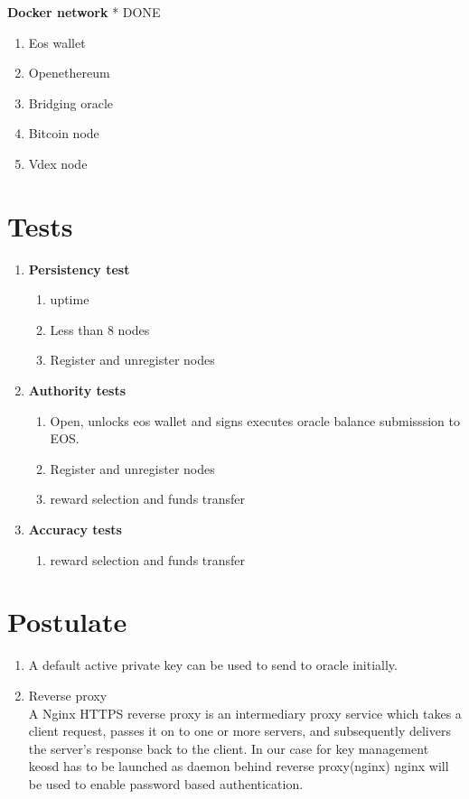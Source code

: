 \documentclass[]{article}
\begin{document}
   \textbf{Docker network}  * {\color{green} DONE}
  \begin{enumerate}
  	\item Eos wallet
  	\item Openethereum
  	\item Bridging oracle
  	\item Bitcoin node
  	\item Vdex node
  \end{enumerate}

\section{Tests}
					\begin{enumerate}
						\item \textbf{Persistency test}
							\begin{enumerate}
								\item uptime\textit{}
								\item Less than 8 nodes 
								\item Register and unregister nodes
							\end{enumerate}
						\item \textbf{Authority tests}
							\begin{enumerate}
							\item Open, unlocks eos wallet and signs executes oracle balance submisssion to EOS.
							\item Register and unregister nodes
							\item reward selection and funds transfer	
						\end{enumerate}
											\item \textbf{Accuracy tests}
													\begin{enumerate}
															\item reward selection and funds transfer	
													\end{enumerate}
				\end{enumerate}
\section{Postulate}
\begin{enumerate}
	\item A default active private key can be used to send to oracle initially.
	\item Reverse proxy \\
	A Nginx HTTPS reverse proxy is an intermediary proxy service which takes a client request, passes it on to one or more servers, and subsequently delivers the server's response back to the client. 
	In our case for key management keosd has to be launched as daemon behind reverse proxy(nginx)
	nginx will be used to enable password based authentication.
\end{enumerate}
\end{document}
